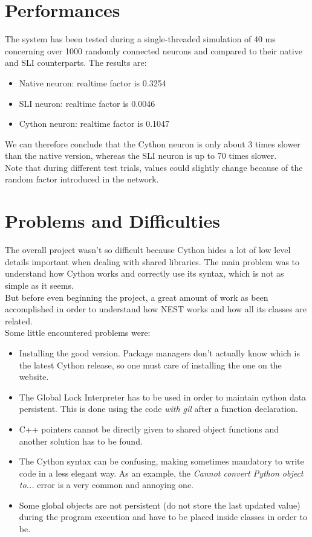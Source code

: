 \documentclass{article}
\begin{document}
\section{Performances}
The system has been tested during a single-threaded simulation of 40 ms concerning over 1000 randomly connected neurons and compared to their native and SLI counterparts. The results are:
\begin{itemize}
\item Native neuron: realtime factor is 0.3254
\item SLI neuron: realtime factor is 0.0046
\item Cython neuron: realtime factor is 0.1047
\end{itemize}
We can therefore conclude that the Cython neuron is only about 3 times slower than the native version, whereas the SLI neuron is up to 70 times slower.\\
Note that during different test trials, values could slightly change because of the random factor introduced in the network.\\


\section{Problems and Difficulties}
The overall project wasn't so difficult because Cython hides a lot of low level details important when dealing with shared libraries. The main problem was to understand how Cython works and correctly use its syntax, which is not as simple as it seems.\\
But before even beginning the project, a great amount of work as been accomplished in order to understand how NEST works and how all its classes are related.\\
Some little encountered problems were:
\begin{itemize}
\item Installing the good version. Package managers don't actually know which is the latest Cython release, so one must care of installing the one on the website.
\item The Global Lock Interpreter has to be used in order to maintain cython data persistent. This is done using the code \emph{with gil} after a function declaration.
\item C++ pointers cannot be directly given to shared object functions and another solution has to be found.
\item The Cython syntax can be confusing, making sometimes mandatory to write code in a less elegant way. As an example, the \emph{Cannot convert Python object to...} error is a very common and annoying one.
\item Some global objects are not persistent (do not store the last updated value) during the program execution and have to be placed inside classes in order to be.
\end{itemize}
\end{document}
